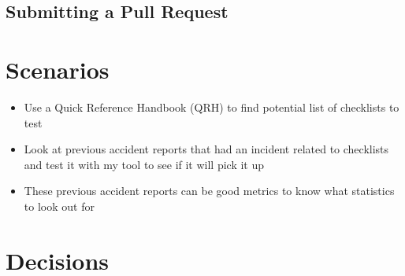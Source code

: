 \documentclass[../dissertation.tex]{subfiles}
\begin{document}
\subsection{Submitting a Pull Request}




\section{Scenarios}
\begin{itemize}
  \item Use a Quick Reference Handbook (QRH) to find potential list of checklists to test
  \item Look at previous accident reports that had an incident related to checklists
    and test it with my tool to see if it will pick it up
  \item These previous accident reports can be good metrics to know what statistics to
    look out for
\end{itemize}


\section{Decisions}
\end{document}

